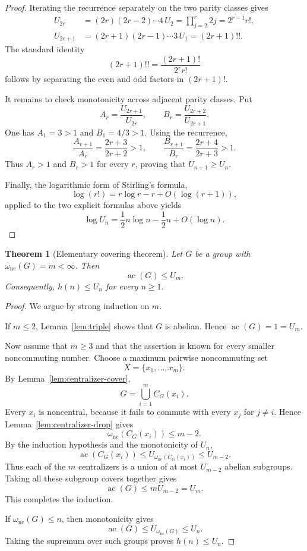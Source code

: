 \documentclass[11pt]{article}
\newtheorem{theorem}{Theorem}[section]
\theoremstyle{definition}
\newcommand{\nc}{\omega_{\mathrm{nc}}}
\newcommand{\ac}{\operatorname{ac}}
\begin{document}
\begin{proof}
Iterating the recurrence separately on the two parity classes gives
\begin{align*}
 U_{2r}
 &= (2r)(2r-2)\cdots 4\,U_2
  = \prod_{j=2}^r 2j
  =2^{r-1}r!,\\
 U_{2r+1}
 &= (2r+1)(2r-1)\cdots 3\,U_1
  =(2r+1)!!.
\end{align*}
The standard identity
\[
 (2r+1)!!=\frac{(2r+1)!}{2^r r!}
\]
follows by separating the even and odd factors in $(2r+1)!$.

It remains to check monotonicity across adjacent parity classes.  Put
\[
 A_r=\frac{U_{2r+1}}{U_{2r}},
 \qquad
 B_r=\frac{U_{2r+2}}{U_{2r+1}}.
\]
One has $A_1=3>1$ and $B_1=4/3>1$.  Using the recurrence,
\[
 \frac{A_{r+1}}{A_r}=\frac{2r+3}{2r+2}>1,
 \qquad
 \frac{B_{r+1}}{B_r}=\frac{2r+4}{2r+3}>1.
\]
Thus $A_r>1$ and $B_r>1$ for every $r$, proving that $U_{n+1}\ge U_n$.

Finally, the logarithmic form of Stirling's formula,
\[
 \log(r!)=r\log r-r+O(\log(r+1)),
\]
applied to the two explicit formulas above yields
\[
 \log U_n=\frac12n\log n-\frac12n+O(\log n).
\]
\end{proof}

\begin{theorem}[Elementary covering theorem]\label{thm:elementary-upper}
Let $G$ be a group with $\nc(G)=m<\infty$.  Then
\[
 \ac(G)\le U_m.
\]
Consequently, $h(n)\le U_n$ for every $n\ge1$.
\end{theorem}

\begin{proof}
We argue by strong induction on $m$.

If $m\le2$, Lemma~\ref{lem:triple} shows that $G$ is abelian.  Hence $\ac(G)=1=U_m$.

Now assume that $m\ge3$ and that the assertion is known for every smaller noncommuting number.  Choose a maximum pairwise noncommuting set
\[
 X=\{x_1,\dots,x_m\}.
\]
By Lemma~\ref{lem:centralizer-cover},
\[
 G=\bigcup_{i=1}^m C_G(x_i).
\]
Every $x_i$ is noncentral, because it fails to commute with every $x_j$ for $j\ne i$.  Hence Lemma~\ref{lem:centralizer-drop} gives
\[
 \nc(C_G(x_i))\le m-2.
\]
By the induction hypothesis and the monotonicity of $U_n$,
\[
 \ac(C_G(x_i))
 \le U_{\nc(C_G(x_i))}
 \le U_{m-2}.
\]
Thus each of the $m$ centralizers is a union of at most $U_{m-2}$ abelian subgroups.  Taking all these subgroup covers together gives
\[
 \ac(G)\le mU_{m-2}=U_m.
\]
This completes the induction.

If $\nc(G)\le n$, then monotonicity gives
\[
 \ac(G)\le U_{\nc(G)}\le U_n.
\]
Taking the supremum over such groups proves $h(n)\le U_n$.
\end{proof}
\end{document}

